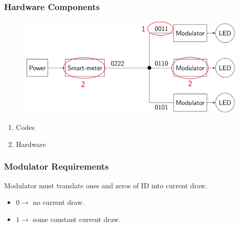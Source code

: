 \documentclass{beamer}
\begin{document}



	\begin{frame}\frametitle{Hardware Components}


		\begin{figure}
			\centering
			\includegraphics[width=\textwidth]{contributions-figure.png}
		\end{figure}
		\begin{enumerate}
				\item Codes
				\item Hardware
		\end{enumerate}
	\end{frame}






	\begin{frame}\frametitle{Modulator Requirements}
		Modulator must translate ones and zeros of ID into current draw.
		\begin{itemize}
			\item $0 \rightarrow$ no current draw.
			\item $1 \rightarrow$ some constant current draw.
		\end{itemize}
	\end{frame}
\end{document}
